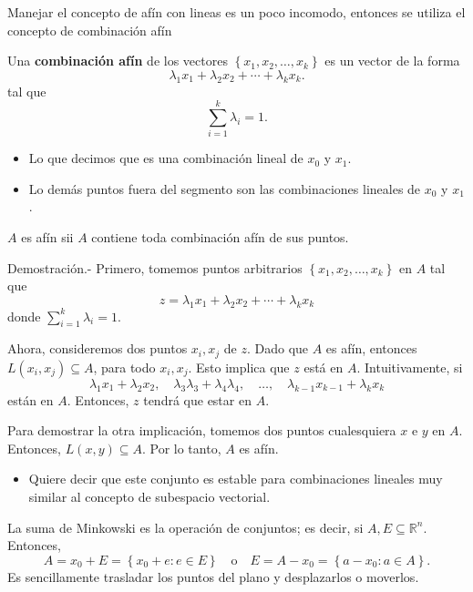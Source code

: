 Manejar el concepto de afín con lineas es un poco incomodo, entonces se utiliza el concepto de combinación afín  

\begin{def.}
    Una \textbf{combinación afín} de los vectores $\left\{x_1,x_2,\ldots,x_k\right\}$ es un vector de la forma 
$$\lambda_1 x_1+\lambda_2x_2+\cdots+\lambda_kx_k.$$
tal que 
$$\sum_{i=1}^k \lambda_i = 1.$$
\end{def.}

\begin{itemize}
    \item Lo que decimos que es una combinación lineal de $x_0$ y $x_1$.
    \item Lo demás puntos fuera del segmento son las combinaciones lineales de $x_0$ y $x_1$.
\end{itemize}

\begin{teo}
    $A$ es afín sii $A$ contiene toda combinación afín de sus puntos.

	Demostración.-\; Primero, tomemos puntos arbitrarios $\left\{x_1,x_2,\ldots,x_k\right\}$ en $A$ tal que 
	$$z=\lambda_1x_1+\lambda_2x_2+\cdots+\lambda_kx_k$$
	donde $\sum\limits_{i=1}^k \lambda_i = 1$. 

	Ahora, consideremos dos puntos $x_i,x_j$ de $z$. Dado que $A$ es afín, entonces $L(x_i,x_j)\subseteq A$, para todo $x_i,x_j$. Esto implica que $z$ está en $A$. Intuitivamente, si 
	$$\lambda_1x_1+\lambda_2 x_2,\quad \lambda_3\lambda_3+\lambda_4\lambda_4,\quad \ldots,\quad  \lambda_{k-1}x_{k-1}+\lambda_kx_k$$ 
	están en $A$. Entonces, $z$ tendrá que estar en $A$.

	Para demostrar la otra implicación, tomemos dos puntos cualesquiera $x$ e $y$ en $A$.  Entonces, $L(x,y)\subseteq A$. Por lo tanto, $A$ es afín.
\end{teo}

\begin{itemize}
    \item Quiere decir que este conjunto es estable para combinaciones lineales muy similar al concepto de subespacio vectorial.
\end{itemize}
\vspace{.5cm}

\begin{notacion}
La suma de Minkowski es la operación de conjuntos; es decir, si $A,E\subseteq \mathbb{R}^n$. Entonces,
$$A=x_0+E=\left\{x_0+e:e\in E \right\} \quad \mbox{o}\quad E=A-x_0=\left\{a-x_0:a\in A\right\}.$$ 
Es sencillamente trasladar los puntos del plano y desplazarlos o moverlos.
\end{notacion}

